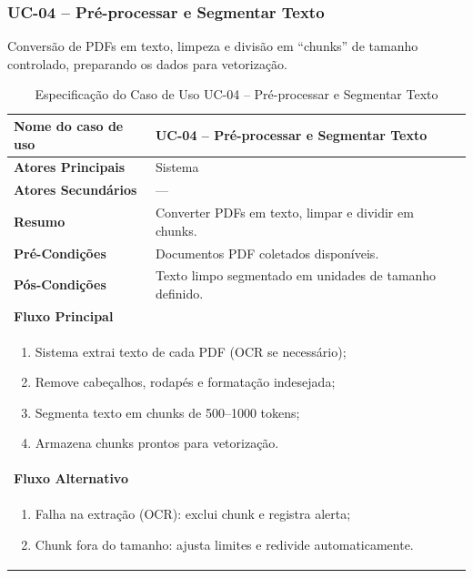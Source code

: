 \begin{description}
\subsubsection{UC-04 – Pré-processar e Segmentar Texto}
\noindent Conversão de PDFs em texto, limpeza e divisão em “chunks” de tamanho controlado, preparando os dados para vetorização.
\begin{table}[H]
  \centering
  \caption{Especificação do Caso de Uso UC-04 – Pré-processar e Segmentar Texto}
  \label{tab:uc04}
  \begin{tabular}{|p{4cm}|p{11cm}|}
    \hline
    \textbf{Nome do caso de uso}    & UC-04 – Pré-processar e Segmentar Texto \\ \hline
    \textbf{Atores Principais}      & Sistema                                  \\ \hline
    \textbf{Atores Secundários}     & —                                        \\ \hline
    \textbf{Resumo}                 & Converter PDFs em texto, limpar e dividir em chunks. \\ \hline
    \textbf{Pré-Condições}          & Documentos PDF coletados disponíveis. \\ \hline
    \textbf{Pós-Condições}          & Texto limpo segmentado em unidades de tamanho definido. \\ \hline
    \multicolumn{2}{|l|}{\textbf{Fluxo Principal}} \\ \hline
    \multicolumn{2}{|p{15cm}|}{%
      \begin{enumerate}[leftmargin=*]
        \item Sistema extrai texto de cada PDF (OCR se necessário);
        \item Remove cabeçalhos, rodapés e formatação indesejada;
        \item Segmenta texto em chunks de 500–1000 tokens;
        \item Armazena chunks prontos para vetorização.
      \end{enumerate}
    } \\ \hline
    \multicolumn{2}{|l|}{\textbf{Fluxo Alternativo}} \\ \hline
    \multicolumn{2}{|p{15cm}|}{%
      \begin{enumerate}[label=\arabic* a\,.]
        \item Falha na extração (OCR): exclui chunk e registra alerta;
        \item Chunk fora do tamanho: ajusta limites e redivide automaticamente.
      \end{enumerate}
    } \\ \hline
  \end{tabular}
\end{table}


\end{description}

